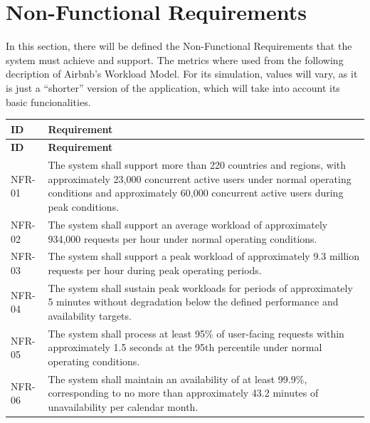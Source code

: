 \section{Non-Functional Requirements}

In this section, there will be defined the Non-Functional Requirements that the system must achieve and support. The metrics
where used from the following decription of Airbnb's Workload Model. For its simulation, values will vary, as it is just a
``shorter'' version of the application, which will take into account its basic funcionalities.

\begin{longtable}{|p{}|p{}|}
    \hline
    \textbf{ID} & 
    \textbf{Requirement} \\
    \hline
    \endfirsthead%

    \hline
    \textbf{ID} & 
    \textbf{Requirement} \\
    \hline
    \endhead%

    NFR-01 &
    The system shall support more than 220 countries and regions, with approximately 23,000 concurrent active users under 
    normal operating conditions and approximately 60,000 concurrent active users during peak conditions. \\
    \hline

    NFR-02 &
    The system shall support an average workload of approximately 934,000 requests per hour under normal operating 
    conditions. \\
    \hline

    NFR-03 &
    The system shall support a peak workload of approximately 9.3 million requests per hour during peak operating 
    periods. \\
    \hline

    NFR-04 &
    The system shall sustain peak workloads for periods of approximately 5 minutes without degradation below the defined 
    performance and availability targets. \\
    \hline

    NFR-05 &
    The system shall process at least 95\% of user-facing requests within approximately 1.5 seconds at the 95th percentile 
    under normal operating conditions. \\
    \hline

    NFR-06 &
    The system shall maintain an availability of at least 99.9\%, corresponding to no more than approximately 43.2 minutes 
    of unavailability per calendar month. \\
    \hline


\end{longtable}
